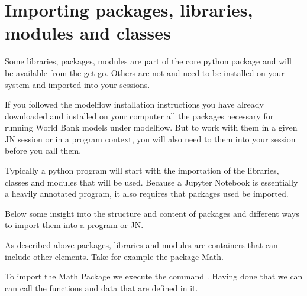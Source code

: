 \documentclass[letterpaper,10pt,english]{jupyterBook}
\begin{document}
\section{Importing packages, libraries, modules and classes}
\label{\detokenize{content/04_PythonEssentials/PythonPackagesEtc:importing-packages-libraries-modules-and-classes}}
\sphinxAtStartPar
Some libraries, packages, modules are part of the core python package and will be available from the get go.  Others are not and need to be installed on your system and imported into your sessions.

\sphinxAtStartPar
If you followed the modelflow installation instructions you have already downloaded and installed on your computer all the packages necessary for running World Bank models under modelflow.  But to work with them in a given JN session or in a program context, you will also need to  them into your session before you call them.

\sphinxAtStartPar
Typically a python program will start with the importation of the libraries, classes and modules that will be used.  Because a Jupyter Notebook is essentially a heavily annotated program, it also requires that packages used be imported.

\sphinxAtStartPar
Below some insight into the structure and content of packages and different ways to import them into a program or JN.

\sphinxAtStartPar
As described above packages, libraries and modules are containers that can include other elements.  Take for example the package Math.

\sphinxAtStartPar
To import the Math Package we execute the command .  Having done that we can can call the functions and data that are defined in it.
\end{document}
